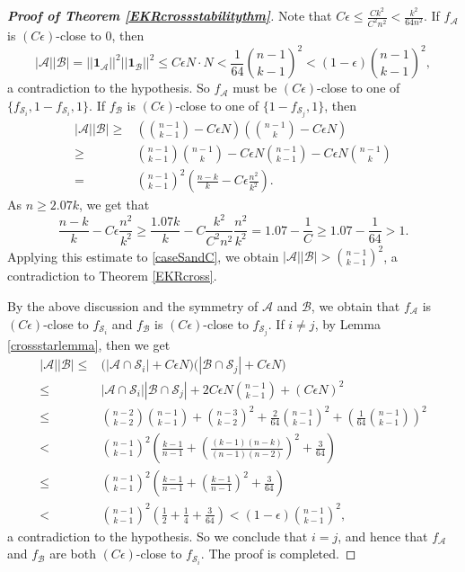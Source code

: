 \documentclass[10pt,a4paper]{amsart}
\numberwithin{equation}{section}
\def\A{\mathcal{A}}
\def\B{\mathcal{B}}
\def\S{\mathcal{S}}
\def\f{\mathbf{f}}
\def\1{\mathbf{1}}
\begin{document}
\begin{proof}[{\bf Proof of Theorem \ref{EKRcrossstabilitythm}}]
Note that $C\epsilon\leq \frac{Ck^2}{C^2n^2} <\frac{k^2}{64n^2}$.
If $f_\A$ is $(C\epsilon)$-close to $0$, then %
$$|\A| |\B|= ||\1_\A||^2  ||\1_\B||^2 \leq C\epsilon N \cdot N
<\frac{1}{64} \binom{n-1}{k-1}^2 <(1-\epsilon)\binom{n-1}{k-1}^2,$$
a contradiction to the hypothesis.
So $f_\A$ must be $(C\epsilon)$-close to one of
$\{f_{\S_i},1-f_{\S_i},1\}$.
If $f_\B$ is $(C\epsilon)$-close to one of $\{1-f_{\S_j},1\}$, then
\begin{align}\nonumber
|\A| |\B|
\geq &
\left( \binom{n-1}{k-1} -C\epsilon N  \right)\left( \binom{n-1}{k } -C\epsilon N  \right)\\\nonumber
\geq&\binom{n-1}{k-1}\binom{n-1}{k }
- C\epsilon N\binom{n-1}{k-1} - C\epsilon N \binom{n-1}{k } \\\label{caseSandC}
=&  \binom{n-1}{k-1}^2 \left(\frac{n-k}{k}-C\epsilon\frac{n^2}{k^2}   \right).
\end{align}
As $n\geq 2.07k$, we get that %
$$\frac{n-k}{k}- C\epsilon\frac{n^2}{k^2}
\geq \frac{1.07k}{k}- C\frac{k^2}{  C^2 n ^2 }\frac{n^2}{k^2}
=  1.07- \frac{1}{C}\geq 1.07- \frac{1}{64}>1.$$
Applying this estimate to \eqref{caseSandC}, we obtain $|\A| |\B|>\binom{n-1}{k-1}^2$,
a contradiction to Theorem \ref{EKRcross}.



By the above discussion and the symmetry of $\A$ and $\B$,
we obtain that $f_\A$ is $(C\epsilon)$-close to $f_{\S_i}$
and $f_\B$ is $(C\epsilon)$-close to $f_{\S_j}$.
If $i\neq j$, by Lemma \ref{crossstarlemma}, then we get
\begin{align*}
|\A| |\B|\leq & \big(| \A\cap \mathcal{S}_i|+ C\epsilon N\big)
\big(|\B \cap \mathcal{S}_j| + C\epsilon N\big)\\
\leq & | \A\cap \mathcal{S}_i| | \B\cap \mathcal{S}_j|
+ 2C\epsilon N \binom{n-1}{k-1}+ (C\epsilon N)^2\\
\leq& \binom{n-2}{k-2}\binom{n-1}{k-1}+\binom{n-3}{k-2}^2
+ \frac{2}{64}\binom{n-1}{k-1}^2 + \left(\frac{1}{64 }\binom{n-1}{k-1} \right)^2\\
<& \binom{n-1}{k-1}^2\left(\frac{k-1}{n-1}
+ \left(\frac{(k-1)(n-k)}{(n-1)(n-2)}\right)^2+ \frac{3}{64} \right)\\
\leq & \binom{n-1}{k-1}^2\left(\frac{k-1}{n-1}
+ \left(\frac{k-1}{n-1}\right)^2+ \frac{3}{64} \right)\\
< & \binom{n-1}{k-1}^2\left(\frac{1}{2}+\frac{1}{4} + \frac{3}{64} \right) <(1-\epsilon)\binom{n-1}{k-1}^2,
\end{align*}
a contradiction to the hypothesis.
So we conclude that $i=j$, and hence that $f_\A$ and $f_\B$ are both $(C\epsilon)$-close to $f_{\S_i}$.
The proof is completed.
\end{proof}
\end{document}
